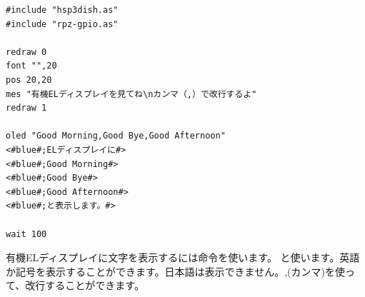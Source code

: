 \begin{lstlisting}[caption=oled.hsp,label=oled.hsp]
#include "hsp3dish.as"
#include "rpz-gpio.as"

redraw 0
font "",20
pos 20,20
mes "有機ELディスプレイを見てね\nカンマ（,）で改行するよ"
redraw 1

oled "Good Morning,Good Bye,Good Afternoon"
<#blue#;ELディスプレイに#>
<#blue#;Good Morning#>
<#blue#;Good Bye#>
<#blue#;Good Afternoon#>
<#blue#;と表示します。#>

wait 100
\end{lstlisting}

有機ELディスプレイに文字を表示するには命令を使います。
と使います。英語か記号を表示することができます。日本語は表示できません。,(カンマ)を使って、改行することができます。\\

\begin{tcolorbox}[title=\useOmetoi]
\begin{enumerate}
\end{enumerate}
\end{tcolorbox}
